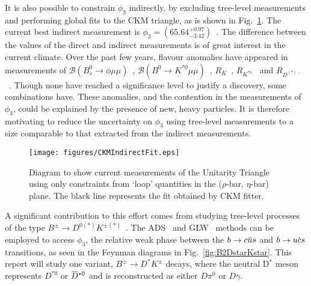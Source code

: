 \documentclass[oneside,12pt]{article}
\newcommand{\overbar}[1]{\mkern 1.5mu\overline{\mkern-1.5mu#1\mkern-1.5mu}\mkern
1.5mu}
\begin{document}
It is also possible to constrain $\phi_3$ indirectly, by excluding tree-level
measurements and performing global fits to the CKM triangle, as is shown in
Fig.~\ref{fig:CKMIndirectFit}. The current best indirect measurement is
$\phi_3=(65.64^{+0.97}_{-3.42})$\degree~\cite{website:CKMFitter}. The
difference between the values of the direct and indirect measurements is of
great interest in the current climate. Over the past few years, flavour
anomalies have appeared in measurements of $\mathcal{B} (B^{0}_{s}\rightarrow
\phi \mu \mu)$~\cite{B2phimumu}, $\mathcal{B} (B^{0}\rightarrow K^{*0} \mu
\mu)$~\cite{B2Kstmumu}, $R_{K}$~\cite{Rk}, $R_{K^{*0}}$~\cite{Rkst} and
$R_{D^{(*)-}}$~\cite{RDst}. Though none have reached a significance level to
justify a discovery, some combinations have. These anomalies, and the
contention in the measurements of $\phi_3$, could be explained by the presence
of new, heavy particles. It is therefore motivating to reduce the uncertainty
on $\phi_{3}$ using tree-level measurements to a size comparable to that
extracted from the indirect measurements.
\begin{figure}[H]
	\centering \texttt{[image: figures/CKMIndirectFit.eps]}
\caption{\small{Diagram to show current measurements of the Unitarity Triangle
using only constraints from `loop' quantities in the ($\rho$-bar, $\eta$-bar)
plane. The black line represents the fit obtained by CKM fitter.}}
\label{fig:CKMIndirectFit} \vspace{-10pt}
\end{figure}
A significant contribution to this effort comes from studying tree-level
processes of the type $B^{\pm}\rightarrow D^{0(*)}K^{\pm (*)}$~\cite{B2DKD2hh,
DalitzRun1, DalitzRun2, B2DKstD2hh, B2DstKD2hh}. The ADS~\cite{ADSRef} and
GLW~\cite{GLWRef} methods can be employed to access $\phi_3$, the relative weak
phase between the $b\rightarrow c\overbar{u}s$ and $b\rightarrow u\overbar{c}s$
transitions, as seen in the Feynman diagrams in Fig.~\ref{fig:B2DstarKstar}.
This report will study one variant, $B^{\pm}\rightarrow D^{*}K^{\pm}$ decays,
where the neutral D$^{*}$ meson represents $D^{*0}$ or $\overbar{D}^{*0}$ and
is reconstructed as either $D\pi^{0}$ or $D\gamma$. 
\end{document}
